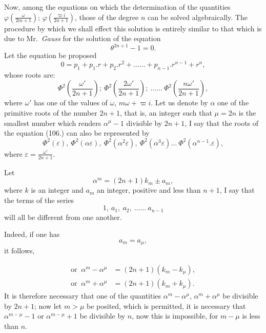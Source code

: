 \documentclass{article}
\begin{document}
Now, among the equations on which the determination of the quantities $\varphi\left(\frac{\omega}{2m+1}\right)$; $\varphi\left(\frac{\varpi i}{2n+1}\right)$, those of the degree $n$ can be solved algebraically. The procedure by which we shall effect this solution is entirely similar to that which is due to Mr.\ \emph{Gauss} for the solution of the equation
\[ \theta^{2n+1}-1=0. \]
Let the equation be proposed
\[ 0=p_{1}+p_{1}.r+p_{2}.r^{2}+\ldots\ldots+p_{n-1}.r^{n-1}+r^{n}, \tag{106.} \]
whose roots are:
\[ \Phi^{2}\left(\frac{\omega'}{2n+1}\right);\ \Phi^{2}\left(\frac{2\omega'}{2n+1}\right);\ \ldots\ldots\ \Phi^{2}\left(\frac{n\omega'}{2n+1}\right), \]
where $\omega'$ has one of the values of $\omega$, $m\omega+\varpi i$. Let us denote by $\alpha$ one of the primitive roots of the number $2n+1$, that is, an integer such that $\mu=2n$ is the smallest number which renders $\alpha^{\mu}-1$ divisible by $2n+1$, I say that the roots of the equation (106.) can also be represented by
\[ \Phi^{2}(\varepsilon),\ \Phi^{2}(\alpha\varepsilon),\ \Phi^{2}(\alpha^{2}\varepsilon),\ \Phi^{2}(\alpha^{3}\varepsilon)\ldots\ \Phi^{2}(\alpha^{n-1}.\varepsilon), \tag{107.} \]
where $\varepsilon=\frac{\omega'}{2n+1}$.

Let
\[ \alpha^{m}=(2n+1)k_{m}\pm a_{m}, \]
where $k$ is an integer and $a_{m}$ an integer, positive and less than $n+1$, I say that the terms of the series
\[ 1,\ a_{1},\ a_{2},\ \ldots\ldots\ a_{n-1} \]
will all be different from one another.

Indeed, if one has
\[ a_{m}=a_{\mu}, \]
it follows,

\[ \begin{aligned}
\text{or }\ \alpha^{m}-\alpha^{\mu}&=(2n+1)(k_{m}-k_{\mu}),\\
\text{or }\ \alpha^{m}+\alpha^{\mu}&=(2n+1)(k_{m}+k_{\mu}).
\end{aligned} \]
It is therefore necessary that one of the quantities $\alpha^{m}-\alpha^{\mu}$, $\alpha^{m}+\alpha^{\mu}$ be divisible by $2n+1$; now let $m>\mu$ be posited, which is permitted, it is necessary that $\alpha^{m-\mu}-1$ or $\alpha^{m-\mu}+1$ be divisible by $n$, now this is impossible, for $m-\mu$ is less than $n$.
\end{document}
